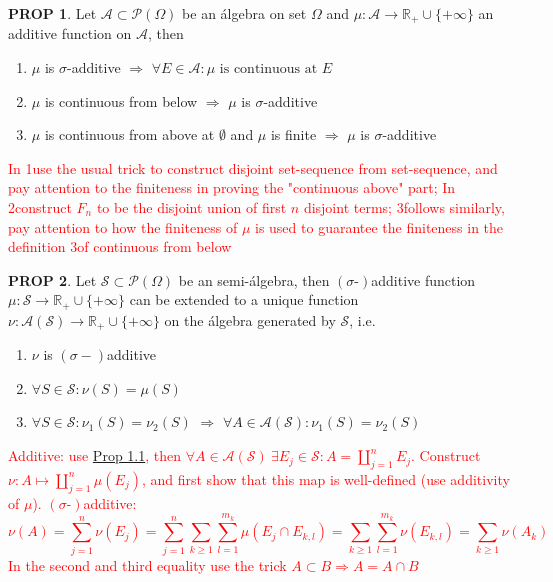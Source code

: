 \documentclass[hidelinks]{article}
\theoremstyle{definition}
\theoremstyle{dotless}
\newtheorem{proposition}{PROP}[section]
\theoremstyle{remark}
\begin{document}
\begin{proposition}\label{Prop 2.2}
Let $\mathscr{A}\subset\mathscr{P}(\Omega)$ be an álgebra on set $\Omega$ and $\mu:\mathscr{A}\to\mathbb{R}_+\cup\{+\infty\}$ an additive function on $\mathscr{A}$, then \begin{enumerate}[label=\arabic*\degree]
    \item $\mu$ is $\sigma$-additive $\Rightarrow$ $\forall E\in\mathscr{A}:\mu\textrm{ is continuous at }E$
    \item $\mu$ is continuous from below $\Rightarrow$ $\mu$ is $\sigma$-additive
    \item $\mu$ is continuous from above at $\emptyset$ and $\mu$ is finite $\Rightarrow$ $\mu$ is $\sigma$-additive
\end{enumerate}
\end{proposition}
\textcolor{red}{In 1\degree  use the usual trick to construct disjoint set-sequence from set-sequence, and pay attention to the finiteness in proving the "continuous above" part; In 2\degree construct $F_n$ to be the disjoint union of first $n$ disjoint terms; 3\degree follows similarly, pay attention to how the finiteness of $\mu$ is used to guarantee the finiteness in the definition 3\degree of continuous from below}

\begin{proposition}\label{Prop 2.3}
Let $\mathscr{S}\subset\mathscr{P}(\Omega)$ be an semi-álgebra, then $(\sigma\textrm{-})$additive function $\mu: \mathscr{S}\to \mathbb{R}_+\cup\{+\infty\}$ can be extended to a unique function $\nu: \mathscr{A}(\mathscr{S})\to \mathbb{R}_+\cup\{+\infty\}$ on the álgebra generated by $\mathscr{S}$, i.e.
\begin{enumerate}[label=\arabic*\degree]
    \item $\nu$ is $(\sigma-)$additive
    \item $\forall S\in\mathscr{S}:\nu(S)=\mu(S)$
    \item $\forall S\in\mathscr{S}:\nu_1(S)=\nu_2(S)$ $\Rightarrow$ $\forall A\in\mathscr{A}(\mathscr{S}):\nu_1(S)=\nu_2(S)$
\end{enumerate}
\end{proposition}
\textcolor{red}{Additive: use \hyperref[Prop 1.1]{Prop 1.1}, then $\forall A\in\mathscr{A}(\mathscr{S})\ \exists E_j\in\mathscr{S}:A=\coprod_{j=1}^nE_j$. Construct $\nu:A\mapsto\coprod_{j=1}^n\mu(E_j)$, and first show that this map is well-defined (use additivity of $\mu$).\smallbreak
$(\sigma\textrm{-})$additive:
\[\nu(A)=\sum_{j=1}^n\nu(E_j)=\sum_{j=1}^n\sum_{k\geq1}\sum_{l=1}^{m_k}\mu(E_j\cap E_{k,l})=\sum_{k\geq1}\sum_{l=1}^{m_k}\nu(E_{k,l})=\sum_{k\geq1}\nu(A_k)\]
In the second and third equality use the trick $A\subset B\Rightarrow A=A\cap B$}
\end{document}
